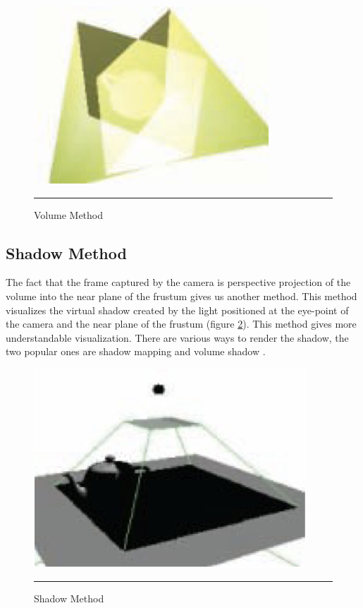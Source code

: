 \begin{figure}[htbp]
	\centering
	\includegraphics{./Primitives/theory_volume.png}
	\rule{35em}{0.5pt}
	\caption[Volume Method]{Volume Method}
	\label{fig:VolumeMethod}
\end{figure}

\subsection{Shadow Method}

The fact that the frame captured by the camera is perspective projection of the volume into the near plane of the frustum gives us another method. This method visualizes the virtual shadow created by the light positioned at the eye-point of the camera and the near plane of the frustum (figure \ref{fig:ShadowMethod}). This method gives more understandable visualization. There are various ways to render the shadow, the two popular ones are shadow mapping \citep{Reference7} \citep{Reference8} and volume shadow \citep{Reference9}.

\begin{figure}[htbp]
	\centering
	\includegraphics{./Primitives/theory_shadow.png}
	\rule{35em}{0.5pt}
	\caption[Shadow Method]{Shadow Method}
	\label{fig:ShadowMethod}
\end{figure}

